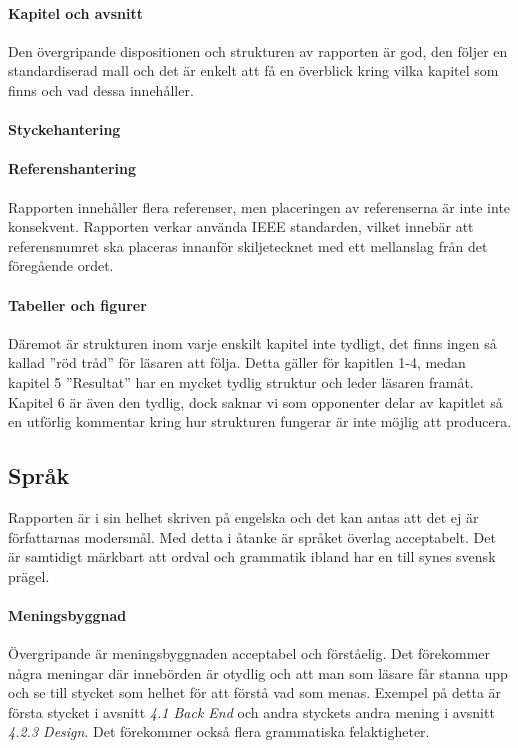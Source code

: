     \paragraph{Kapitel och avsnitt}
        Den övergripande dispositionen och strukturen av rapporten är god, den följer en standardiserad mall och det är enkelt att få en överblick kring vilka kapitel som finns och vad dessa innehåller. \bigskip
     
    \paragraph{Styckehantering}

    \paragraph{Referenshantering}
         Rapporten innehåller flera referenser, men placeringen av referenserna är inte inte konsekvent. Rapporten verkar använda IEEE standarden, vilket innebär att referensnumret ska placeras innanför skiljetecknet med ett mellanslag från det föregående ordet.
    
    \paragraph{Tabeller och figurer}

    
        Däremot är strukturen inom varje enskilt kapitel inte tydligt, det finns ingen så kallad ''röd tråd'' för läsaren att följa. Detta gäller för kapitlen 1-4, medan kapitel 5 ''Resultat'' har en mycket tydlig struktur och leder läsaren framåt. Kapitel 6 är även den tydlig, dock saknar vi som opponenter delar av kapitlet så en utförlig kommentar kring hur strukturen fungerar är inte möjlig att producera.


    \subsection{Språk} %
    \label{sub:sprak}
    Rapporten är i sin helhet skriven på engelska och det kan antas att det ej är författarnas modersmål. Med detta i åtanke är språket överlag acceptabelt. Det är samtidigt märkbart att ordval och grammatik ibland har en till synes svensk prägel.

    \paragraph{Meningsbyggnad}
        Övergripande är meningsbyggnaden acceptabel och förståelig. Det förekommer några meningar där innebörden är otydlig och att man som läsare får stanna upp och se till stycket som helhet för att förstå vad som menas. Exempel på detta är första stycket i avsnitt \emph{4.1 Back End} och andra styckets andra mening i avsnitt \emph{4.2.3 Design}. Det förekommer också flera grammatiska felaktigheter.

